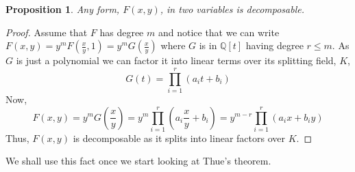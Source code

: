 \documentclass{article}
\newtheorem{proposition}{Proposition}[section]
\newcommand{\mbb}[1]{\mathbb{#1}}
\begin{document}
\begin{proposition}\label{prop: Forms of two variables are decomposable}
    Any form, $F(x,y)$, in two variables is decomposable.
\end{proposition}
\begin{proof}
    Assume that $F$ has degree $m$ and notice that we can write $F(x, y) = y^mF(\frac{x}{y}, 1) = y^m G(\frac{x}{y})$ where $G$ is in $\mbb Q[t]$ having degree $r \leq m$. As $G$ is just a polynomial we can factor it into linear terms over its splitting field, $K$,
    $$G(t) = \prod_{i=1}^r(a_it + b_i)$$
    Now,
    $$F(x,y) = y^m G(\frac{x}{y}) = y^m \prod_{i=1}^r(a_i\frac{x}{y} + b_i) = y^{m-r}\prod_{i=1}^r(a_ix + b_iy) $$
    Thus, $F(x,y)$ is decomposable as it splits into linear factors over $K$. 

\end{proof}
We shall use this fact once we start looking at Thue's theorem. 
\end{document}
